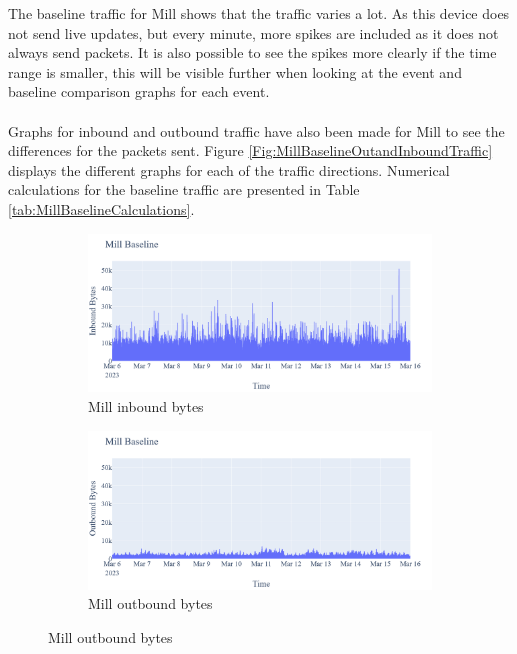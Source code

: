 The baseline traffic for Mill shows that the traffic varies a lot. As this device does not send live updates, but every minute, more spikes are included as it does not always send packets. It is also possible to see the spikes more clearly if the time range is smaller, this will be visible further when looking at the event and baseline comparison graphs for each event. 
\\\\
Graphs for inbound and outbound traffic have also been made for Mill to see the differences for the packets sent. Figure \ref{Fig:MillBaselineOutandInboundTraffic} displays the different graphs for each of the traffic directions. Numerical calculations for the baseline traffic are presented in Table \ref{tab:MillBaselineCalculations}. 

\begin{figure}[H]
    \centering
    \begin{subfigure}[b]{0.4\textwidth}
        \includegraphics[width=\textwidth]{figures/Mill_Baseline_InboundBytes.png}
        \caption{Mill inbound bytes}
    \end{subfigure}
    \begin{subfigure}[b]{0.4\textwidth}
        \includegraphics[width=\textwidth]{figures/Mill_Baseline_OutboundBytes.png}
        \caption{Mill outbound bytes}
    \end{subfigure}

\end{figure}
